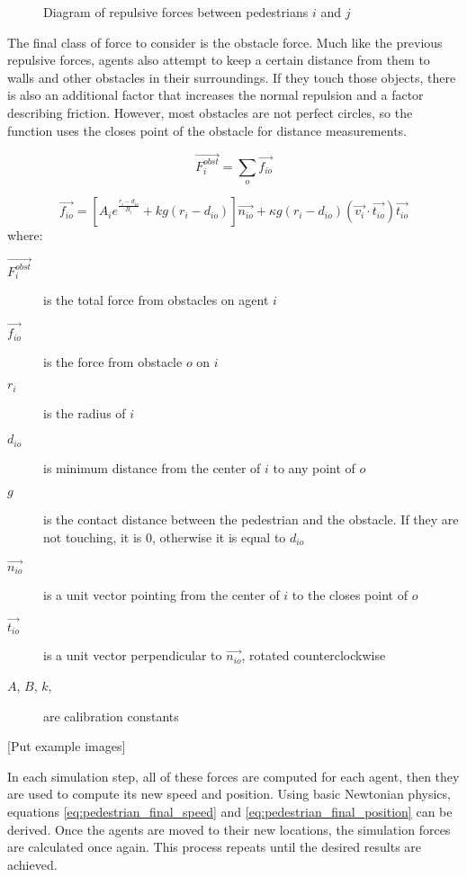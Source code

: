 \documentclass[twoside, 11pt]{article}
\begin{document}
\begin{figure}[h]
  \centering
  
  \caption{Diagram of repulsive forces between pedestrians $i$ and $j$}
  \label{fig:repulsive-forces}
\end{figure}

The final class of force to consider is the obstacle force. Much like the previous repulsive forces, agents also attempt to keep a certain distance from them to walls and other obstacles in their surroundings. If they touch those objects, there is also an additional factor that increases the normal repulsion and a factor describing friction. However, most obstacles are not perfect circles, so the function uses the closes point of the obstacle for distance measurements.

\begin{equation}
  \vec{F_i^{obst}} = \sum_o\vec{f_{io}}
  \label{eq:pedestrian_obstacle_total}
\end{equation}

\begin{equation}
  \vec{f_{io}} = [A_ie^{\frac{r_i - d_{io}}{B_i}} + kg(r_i-d_{io})]\vec{n_{io}} + \kappa g (r_i - d_{io})(\vec{v_i} \cdot \vec{t_{io}})\vec{t_{io}}
  \label{eq:pedestrian_obstacle}
\end{equation}
where:
\begin{description}
  \item[$\vec{F_i^{obst}}$] is the total force from obstacles on agent $i$
  \item[$\vec{f_{io}}$] is the force from obstacle $o$ on $i$
  \item[$r_i$] is the radius of $i$
  \item[$d_{io}$] is minimum distance from the center of $i$ to any point of $o$
  \item[$g$] is the contact distance between the pedestrian and the obstacle. If they are not touching, it is $0$, otherwise it is equal to $d_{io}$
  \item[$\vec{n_{io}}$] is a unit vector pointing from the center of $i$ to the closes point of $o$
  \item[$\vec{t_{io}}$] is a unit vector perpendicular to $\vec{n_{io}}$, rotated counterclockwise
  \item[$A$, $B$, $k$, \kappa] are calibration constants
\end{description}


[Put example images]

In each simulation step, all of these forces are computed for each agent, then they are used to compute its new speed and position. Using basic Newtonian physics, equations \eqref{eq:pedestrian_final_speed} and \eqref{eq:pedestrian_final_position} can be derived. Once the agents are moved to their new locations, the simulation forces are calculated once again. This process repeats until the desired results are achieved.
\end{document}
